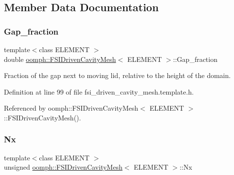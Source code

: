 \subsection{Member Data Documentation}
\mbox{\label{classoomph_1_1FSIDrivenCavityMesh_ad95b3650cfa765b1ac6a0f131d407b23}} 
\subsubsection{\texorpdfstring{Gap\+\_\+fraction}{Gap\_fraction}}
{\footnotesize\ttfamily template$<$class E\+L\+E\+M\+E\+NT $>$ \\
double \hyperlink{classoomph_1_1FSIDrivenCavityMesh}{oomph\+::\+F\+S\+I\+Driven\+Cavity\+Mesh}$<$ E\+L\+E\+M\+E\+NT $>$\+::Gap\+\_\+fraction\hspace{0.3cm}{\ttfamily [protected]}}



Fraction of the gap next to moving lid, relative to the height of the domain. 



Definition at line 99 of file fsi\+\_\+driven\+\_\+cavity\+\_\+mesh.\+template.\+h.



Referenced by oomph\+::\+F\+S\+I\+Driven\+Cavity\+Mesh$<$ E\+L\+E\+M\+E\+N\+T $>$\+::\+F\+S\+I\+Driven\+Cavity\+Mesh().

\mbox{\label{classoomph_1_1FSIDrivenCavityMesh_a179f742e7bb521e8943107be3005d49b}} 
\subsubsection{\texorpdfstring{Nx}{Nx}}
{\footnotesize\ttfamily template$<$class E\+L\+E\+M\+E\+NT $>$ \\
unsigned \hyperlink{classoomph_1_1FSIDrivenCavityMesh}{oomph\+::\+F\+S\+I\+Driven\+Cavity\+Mesh}$<$ E\+L\+E\+M\+E\+NT $>$\+::Nx\hspace{0.3cm}{\ttfamily [protected]}}



